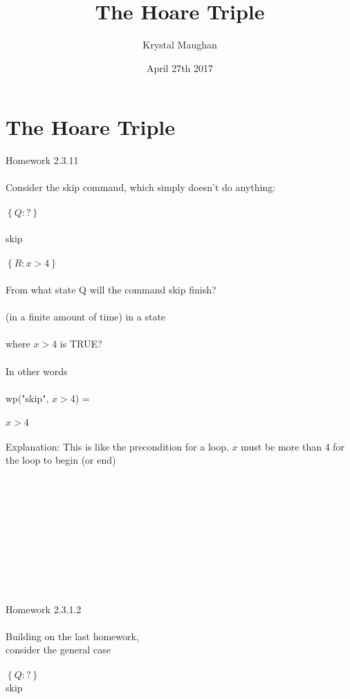 \documentclass{article}
\title{The Hoare Triple}
\author{Krystal Maughan }
\date{April 27th 2017}
\begin{document}
\maketitle

\section{The Hoare Triple}
Homework 2.3.11
\\
\\
Consider the skip command, which simply doesn't do anything:
\\
\\
 $\left\{Q : ?\right\}$
\\
\\
skip
\\
\\
$\left\{R : x > 4\right\}$
\\
\\
From what state Q will the command skip finish?
\\
\\
(in a finite amount of time) in a state
\\
\\ where $ x > 4$ is TRUE?
\\
\\
In other words
\\
\\
wp("skip", $x > 4$) = 
\\
\\
$x > 4$
\\
\\
Explanation:
This is like the precondition for a loop.
$x$ must be more than 4 for the loop to begin (or end)
\\
\\
\\
\\
\\
\\
\\
\\
\\
\\
\\
Homework 2.3.1.2
\\
\\
Building on the last homework,
\\
consider the general case
\\
\\
$\left\{Q : ?\right\}$
\\
skip
\\
\end{document}
